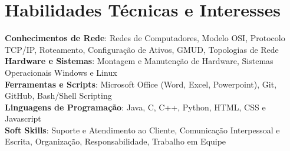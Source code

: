 \documentclass[a4paper,11pt]{article}
\begin{document}
\section{\textbf{Habilidades Técnicas e Interesses}}
\begin{itemize}[leftmargin=0.05in, label={}]
    \small{\item{
     \textbf{Conhecimentos de Rede}{: Redes de Computadores, Modelo OSI, Protocolo TCP/IP, Roteamento, Configuração de Ativos, GMUD, Topologias de Rede} \\ [1.5pt]
     \textbf{Hardware e Sistemas}{: Montagem e Manutenção de Hardware, Sistemas Operacionais Windows e Linux} \\ [1.5pt]
     \textbf{Ferramentas e Scripts}{: Microsoft Office (Word, Excel, Powerpoint), Git, GitHub, Bash/Shell Scripting} \\ [1.5pt]
     \textbf{Linguagens de Programação}{: Java, C, C++, Python, HTML, CSS e Javascript} \\ [1.5pt]
     \textbf{Soft Skills}{: Suporte e Atendimento ao Cliente, Comunicação Interpessoal e Escrita, Organização, Responsabilidade, Trabalho em Equipe}
    }}
\end{itemize}
\vspace{-16pt}
\end{document}
